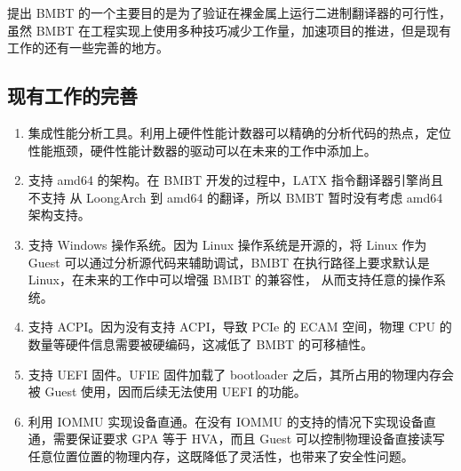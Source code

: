 提出 BMBT 的一个主要目的是为了验证在裸金属上运行二进制翻译器的可行性，虽然 BMBT 在工程实现上使用多种技巧减少工作量，加速项目的推进，但是现有工作的还有一些完善的地方。
\subsection{现有工作的完善}
\begin{enumerate}
	\item 集成性能分析工具。利用上硬件性能计数器可以精确的分析代码的热点，定位性能瓶颈，硬件性能计数器的驱动可以在未来的工作中添加上。
	\item 支持 amd64 的架构。在 BMBT 开发的过程中，LATX 指令翻译器引擎尚且不支持 从 LoongArch 到 amd64 的翻译，所以 BMBT 暂时没有考虑 amd64 架构支持。
	\item 支持 Windows 操作系统。因为 Linux 操作系统是开源的，将 Linux 作为 Guest 可以通过分析源代码来辅助调试，BMBT 在执行路径上要求默认是 Linux，在未来的工作中可以增强 BMBT 的兼容性，
		从而支持任意的操作系统。
	\item 支持 ACPI。因为没有支持 ACPI，导致 PCIe 的 ECAM 空间，物理 CPU 的数量等硬件信息需要被硬编码，这减低了 BMBT 的可移植性。
	\item 支持 UEFI 固件。UFIE 固件加载了 bootloader 之后，其所占用的物理内存会被 Guest 使用，因而后续无法使用 UEFI 的功能。
	\item 利用 IOMMU 实现设备直通。在没有 IOMMU 的支持的情况下实现设备直通，需要保证要求 GPA 等于 HVA，而且 Guest 可以控制物理设备直接读写任意位置位置的物理内存，这既降低了灵活性，也带来了安全性问题。
\end{enumerate}
